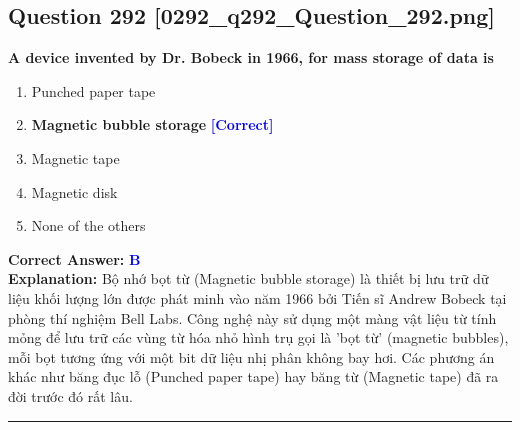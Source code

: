 \documentclass[11pt,a4paper]{article}
\begin{document}
\begin{minipage}{\textwidth}
\subsection*{Question 292 \quad \footnotesize{[0292\_q292\_Question\_292.png]}}
\noindent \textbf{A device invented by Dr. Bobeck in 1966, for mass storage of data is}

\begin{enumerate}[label=\Alph*.]
    \item Punched paper tape
    \item \textbf{Magnetic bubble storage} \hfill \textcolor{blue}{\textbf{[Correct]}}
    \item Magnetic tape
    \item Magnetic disk
    \item None of the others
\end{enumerate}

\noindent \textbf{Correct Answer:} \textcolor{blue}{\textbf{B}} \\[2pt]
\noindent \textbf{Explanation:} Bộ nhớ bọt từ (Magnetic bubble storage) là thiết bị lưu trữ dữ liệu khối lượng lớn được phát minh vào năm 1966 bởi Tiến sĩ Andrew Bobeck tại phòng thí nghiệm Bell Labs. Công nghệ này sử dụng một màng vật liệu từ tính mỏng để lưu trữ các vùng từ hóa nhỏ hình trụ gọi là 'bọt từ' (magnetic bubbles), mỗi bọt tương ứng với một bit dữ liệu nhị phân không bay hơi. Các phương án khác như băng đục lỗ (Punched paper tape) hay băng từ (Magnetic tape) đã ra đời trước đó rất lâu.

\par\vspace{0.3cm}
\hrule
\vspace{0.3cm}
\end{minipage}
\end{document}

